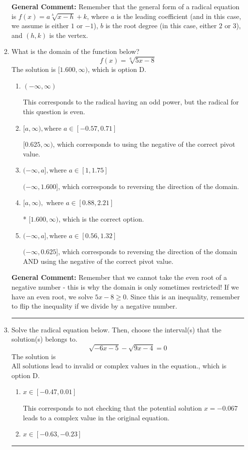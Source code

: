 \documentclass{extbook}[14pt]
\newcommand{\litem}[1]{\item #1

\rule{\textwidth}{0.4pt}}
\begin{document}
\begin{enumerate}
{\textbf{General Comment:} Remember that the general form of a radical equation is $ f(x) = a \sqrt[b]{x - h} + k$, where $a$ is the leading coefficient (and in this case, we assume is either $1$ or $-1$), $b$ is the root degree (in this case, either $2$ or $3$), and $(h, k)$ is the vertex.
}
\litem{
What is the domain of the function below?
\[ f(x) = \sqrt[6]{5 x - 8} \]The solution is \( [1.600, \infty) \), which is option D.\begin{enumerate}[label=\Alph*.]
\item \( (-\infty, \infty) \)

This corresponds to the radical having an odd power, but the radical for this question is even.
\item \( [a, \infty), \text{where } a \in [-0.57, 0.71] \)

$[0.625, \infty)$, which corresponds to using the negative of the correct pivot value.
\item \( (-\infty, a], \text{where } a \in [1, 1.75] \)

 $(-\infty, 1.600]$, which corresponds to reversing the direction of the domain.
\item \( [a, \infty), \text{ where } a \in [0.88, 2.21] \)

* $[1.600, \infty)$, which is the correct option.
\item \( (-\infty, a], \text{where } a \in [0.56, 1.32] \)

$(-\infty, 0.625]$, which corresponds to reversing the direction of the domain AND using the negative of the correct pivot value.
\end{enumerate}

\textbf{General Comment:} Remember that we cannot take the even root of a negative number - this is why the domain is only sometimes restricted! If we have an even root, we solve $5 x - 8 \geq 0$. Since this is an inequality, remember to flip the inequality if we divide by a negative number.
}
\litem{
Solve the radical equation below. Then, choose the interval(s) that the solution(s) belongs to.
\[ \sqrt{-6 x - 5} - \sqrt{9 x - 4} = 0 \]The solution is \( \text{All solutions lead to invalid or complex values in the equation.} \), which is option D.\begin{enumerate}[label=\Alph*.]
\item \( x \in [-0.47,0.01] \)

This corresponds to not checking that the potential solution $x = -0.067$ leads to a complex value in the original equation.
\item \( x \in [-0.63,-0.23] \)


\end{enumerate}}
\end{enumerate}
\end{document}
